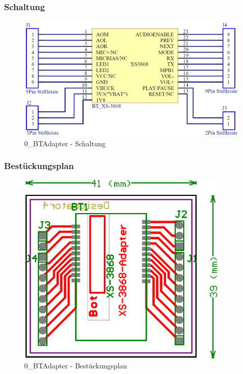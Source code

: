 \subsubsection*{Schaltung}
\begin{figure} [H]
	\centering
	\includegraphics[width=1\textwidth]{img/BTModul/adapter_sch.png}
	\caption{0\_BTAdapter - Schaltung}
	\label {fig:8.10.1}
\end{figure}

\newpage
\subsubsection*{Bestückungsplan}
\begin{figure} [H]
	\centering
	\includegraphics[width=0.9\textwidth]{img/BTModul/adapter_Best.png}
	\caption{0\_BTAdapter - Bestückungsplan}
	\label {fig:8.10.2}
\end{figure}

